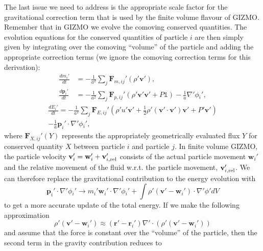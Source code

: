 The last issue we need to address is the appropriate scale factor for the
gravitational correction term that is used by the finite volume flavour of
GIZMO. Remember that in GIZMO we evolve the comoving conserved quantities. The
evolution equations for the conserved quantities of particle $i$ are then
simply given by integrating over the
comoving ``volume'' of the particle and adding the appropriate correction terms
(we ignore the comoving correction terms for this derivation):
\begin{align}
\frac{d m_i'}{dt} &= -\frac{1}{a^2} \sum_j
\mathbf{F}_{m,ij}'\left(\rho{}'\mathbf{v}'\right),\\
\frac{d \mathbf{p}_i'}{dt} &= -\frac{1}{a^2} \sum_j
\mathbf{F}_{p,ij}'\left(\rho{}'\mathbf{v}'\mathbf{v}' +
P\mathbb{1}\right) - \frac{1}{a}\nabla{}'\phi{}_i',
\end{align}
\begin{multline}
\frac{d E_i'}{dt} = -\frac{1}{a^2} \sum_j
\mathbf{F}_{E,ij}'\left( \rho{}' u' \mathbf{v}' +
\frac{1}{2} \rho{}' \left(\mathbf{v}'\cdot \mathbf{v}'\right)
\mathbf{v}' + P' \mathbf{v}' \right) \\
- \frac{1}{a} \mathbf{p}_i'\cdot{}\nabla{}'\phi{}_i',
\end{multline}
where $\mathbf{F}_{X,ij}'(Y)$ represents the appropriately geometrically evaluated
flux $Y$ for conserved quantity $X$ between particle $i$ and particle $j$.
In finite volume GIZMO, the particle
velocity $\mathbf{v}_i' = \mathbf{w}_i' + \mathbf{v}_{i,{\rm{}rel}}'$ consists of the
actual particle movement $\mathbf{w}_i'$ and the relative movement of the fluid
w.r.t. the particle movement, $\mathbf{v}_{i,{\rm{}rel}}'$.
We can therefore replace the gravitational contribution
to the energy evolution with \citep{Springel2010}
\begin{equation}
\mathbf{p}_i'\cdot{}\nabla{}'\phi{}_i' \rightarrow{} m_i'\mathbf{w}_i' \cdot{}
\nabla{}'\phi{}_i' + \int{} \rho{}'\left(\mathbf{v}' -
\mathbf{w}_i' \right)\cdot{}
\nabla{}'\phi{}' dV
\end{equation}
to get a more accurate update of the total energy. If we make the following
approximation
\begin{equation}
\rho{}'\left(\mathbf{v}' - \mathbf{w}_i' \right) \approx{}
\left(\mathbf{r}' - \mathbf{r}_i'\right) \nabla{}' \cdot{}
\left( \rho{}' \left( \mathbf{v}' - \mathbf{w}_i' \right) \right)
\end{equation}
and assume that the force is constant over the ``volume'' of the particle, then
the second term in the gravity contribution reduces to
